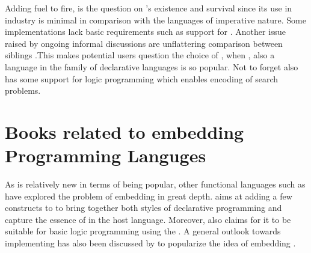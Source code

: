 \documentclass[thesis-solanki.tex]{subfiles}
\begin{document}
Adding fuel to fire, is the question on 's existence and survival
\cite{website:prolog-killer,website:prolog-steam,website:prolog-death,somogyi1995logic} since its use in industry
is minimal in comparison with the languages of imperative nature.
Some  implementations lack basic requirements such as support for .
Another issue raised by ongoing informal discussions are unflattering comparison between siblings \cite{website:haskell-choice}.This makes 
potential users question the choice of , when , also a language in the family of declarative languages 
is so popular.
Not to forget  also has some support for logic programming \cite{website:logic-programming-haskell} which
enables encoding of search problems. 

\section{Books related to embedding Programming Languges}

As  is relatively new in terms of being popular, other functional languages such as  have
explored the problem of embedding in great depth. \cite{friedman05reasoned} aims at adding a few
constructs to  to bring together both styles of declarative programming and capture the essence of
 in the host language.
Moreover,  also claims for it to be suitable for basic logic programming using the
 \cite{website:logicprogexamplehaskell}.
A general outlook towards implementing  has also been discussed by
\cite{krishnamurthi2007programming} to popularize the idea of embedding .
\end{document}
